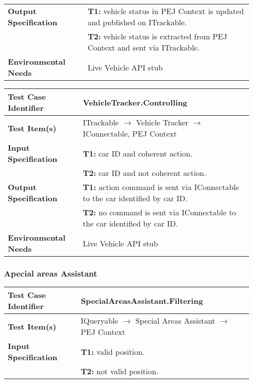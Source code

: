 {\begin{tabularx}{\textwidth}{l X}
    \textbf{Output Specification} & \textbf{T1:} vehicle status in PEJ Context is updated and published on ITrackable.\\
    & \textbf{T2:} vehicle status is extracted from PEJ Context and sent via ITrackable.\\
    \hline 
    
    \textbf{Environmental Needs} & Live Vehicle API stub\\
    \hline
\end{tabularx}
\bigskip 

\noindent
\begin{tabularx}{\textwidth}{l X}
    \hline 
    \textbf{Test Case Identifier} & VehicleTracker.Controlling\\ 
    \hline 
    
    \textbf{Test Item(s)} & ITrackable $\rightarrow$ Vehicle Tracker $\rightarrow$ IConnectable, PEJ Context\\
    \hline 
    
    \textbf{Input Specification} & \textbf{T1:} car ID and coherent action.\\
                                & \textbf{T2:} car ID and not coherent action.\\
    \hline 
    
    \textbf{Output Specification} & \textbf{T1:} action command is sent via IConnectable to the car identified by car ID.\\
                                & \textbf{T2:} no command is sent via IConnectable to the car identified by car ID.\\
    \hline 
    
    \textbf{Environmental Needs} & Live Vehicle API stub\\
    \hline
\end{tabularx}

\noindent 
\subsubsection{Apecial areas Assistant}
\begin{tabularx}{\textwidth}{l X}
    \hline 
    \textbf{Test Case Identifier} & SpecialAreasAssistant.Filtering\\ 
    \hline 
    
    \textbf{Test Item(s)} & IQueryable $\rightarrow$ Special Areas Assistant $\rightarrow$ PEJ Context\\
    \hline 
    
    \textbf{Input Specification} & \textbf{T1:} valid position.\\
                                & \textbf{T2:} not valid position.\\
    \hline 
    

\end{tabularx}}
